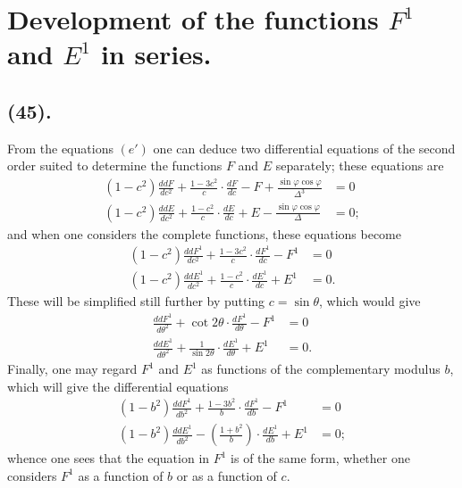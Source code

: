 \documentclass{article}
\begin{document}

\section*{Development of the functions $F^{1}$ and $E^{1}$ in series.}

\subsection*{(45).}

From the equations $(e')$ one can deduce two differential equations of the second order suited to determine the functions $F$ and $E$ separately; these equations are
\[ \begin{aligned} (1-c^{2})\frac{ddF}{dc^{2}}+\frac{1-3c^{2}}{c}\cdot\frac{dF}{dc}-F+\frac{\sin\varphi\cos\varphi}{\Delta^{3}}&=0\\ (1-c^{2})\frac{ddE}{dc^{2}}+\frac{1-c^{2}}{c}\cdot\frac{dE}{dc}+E-\frac{\sin\varphi\cos\varphi}{\Delta}&=0; \end{aligned} \]
and when one considers the complete functions, these equations become
\[ \begin{aligned} (1-c^{2})\frac{ddF^{1}}{dc^{2}}+\frac{1-3c^{2}}{c}\cdot\frac{dF^{1}}{dc}-F^{1}&=0\\ (1-c^{2})\frac{ddE^{1}}{dc^{2}}+\frac{1-c^{2}}{c}\cdot\frac{dE^{1}}{dc}+E^{1}&=0. \end{aligned} \]
These will be simplified still further by putting $c=\sin\theta$, which would give
\[ \begin{aligned} \frac{ddF^{1}}{d\theta^{2}}+\cot 2\theta\cdot\frac{dF^{1}}{d\theta}-F^{1}&=0\\ \frac{ddE^{1}}{d\theta^{2}}+\frac{1}{\sin 2\theta}\cdot\frac{dE^{1}}{d\theta}+E^{1}&=0. \end{aligned} \]
Finally, one may regard $F^{1}$ and $E^{1}$ as functions of the complementary modulus $b$, which will give the differential equations
\[ \begin{aligned} (1-b^{2})\frac{ddF^{1}}{db^{2}}+\frac{1-3b^{2}}{b}\cdot\frac{dF^{1}}{db}-F^{1}&=0\\ (1-b^{2})\frac{ddE^{1}}{db^{2}}-\left(\frac{1+b^{2}}{b}\right)\cdot\frac{dE^{1}}{db}+E^{1}&=0; \end{aligned} \]
whence one sees that the equation in $F^{1}$ is of the same form, whether one considers $F^{1}$ as a function of $b$ or as a function of $c$.
\end{document}
